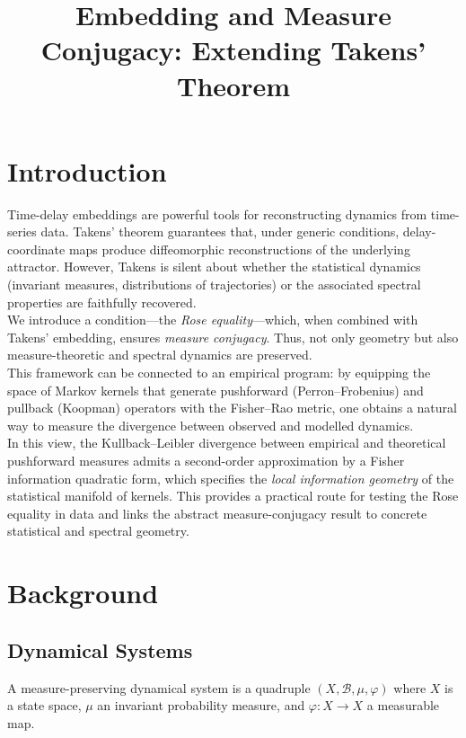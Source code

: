 \documentclass[11pt]{article}
\title{Embedding and Measure Conjugacy: Extending Takens' Theorem}
\author{}
\date{}
\begin{document}
\maketitle

\section{Introduction}
Time-delay embeddings are powerful tools for reconstructing dynamics from time-series data. Takens' theorem guarantees that, under generic conditions, delay-coordinate maps produce diffeomorphic reconstructions of the underlying attractor. However, Takens is silent about whether the statistical dynamics (invariant measures, distributions of trajectories) or the associated spectral properties are faithfully recovered. \\

We introduce a condition---the \emph{Rose equality}---which, when combined with Takens' embedding, ensures \emph{measure conjugacy}. Thus, not only geometry but also measure-theoretic and spectral dynamics are preserved. \\

This framework can be connected to an empirical program: by equipping the space of Markov kernels that generate pushforward (Perron--Frobenius) and pullback (Koopman) operators with the Fisher--Rao metric, one obtains a natural way to measure the divergence between observed and modelled dynamics. \\

In this view, the Kullback--Leibler divergence between empirical and theoretical pushforward measures admits a second-order approximation by a Fisher information quadratic form, which specifies the \emph{local information geometry} of the statistical manifold of kernels. This provides a practical route for testing the Rose equality in data and links the abstract measure-conjugacy result to concrete statistical and spectral geometry.

\section{Background}
\subsection{Dynamical Systems}
A measure-preserving dynamical system is a quadruple $(X, \mathcal{B}, \mu, \varphi)$ where $X$ is a state space, $\mu$ an invariant probability measure, and $\varphi : X \to X$ a measurable map.
\end{document}
